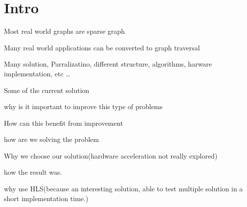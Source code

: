 \chapter{Intro} \label{intro}

\begin{list_type}  
\item Most real world graphs are sparse graph
\item Many real world applications can be converted to graph traversal
\item Many solution, Parralizatino, different structure, algorithms, harware implementation, etc \ldots 
\item Some of the current solution
\item why is it important to improve this type of problems
\item How can this benefit from improvement
\item how are we solving the problem
\item Why we choose our solution(hardware acceleration not really explored)
\item how the result was.
\item why use HLS(because an interesting solution, able to test multiple solution in a short implementation time.)
\item 
\end{list_type}

